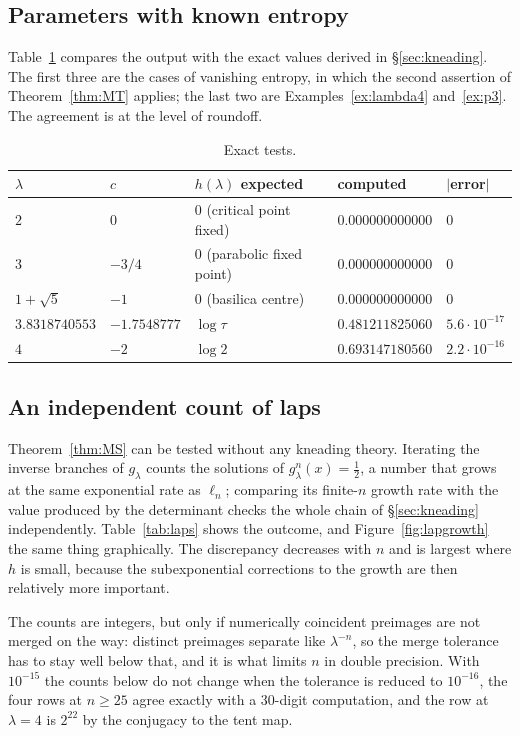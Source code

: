\documentclass[11pt]{article}
\theoremstyle{plain}
\theoremstyle{definition}
\begin{document}
\subsection{Parameters with known entropy}

Table~\ref{tab:exact} compares the output with the exact values derived in
\S\ref{sec:kneading}.  The first three are the cases of vanishing entropy, in which
the second assertion of Theorem~\ref{thm:MT} applies; the last two are
Examples~\ref{ex:lambda4}
and~\ref{ex:p3}.  The agreement is at the level of roundoff.

\begin{table}[h]
\centering\small
\setlength{\tabcolsep}{7pt}
\begin{tabular}{lllll}
\toprule
$\lambda$ & $c$ & $h(\lambda)$ expected & computed & $|$error$|$ \\
\midrule
$2$ & $0$ & $0$ (critical point fixed) & $0.000000000000$ & $0$ \\
$3$ & $-3/4$ & $0$ (parabolic fixed point) & $0.000000000000$ & $0$ \\
$1+\sqrt5$ & $-1$ & $0$ (basilica centre) & $0.000000000000$ & $0$ \\
$3.8318740553$ & $-1.7548777$ & $\log\tau$ & $0.481211825060$ & $5.6\cdot10^{-17}$ \\
$4$ & $-2$ & $\log2$ & $0.693147180560$ & $2.2\cdot10^{-16}$ \\
\bottomrule
\end{tabular}
\caption{Exact tests.}
\label{tab:exact}
\end{table}

\subsection{An independent count of laps}

Theorem~\ref{thm:MS} can be tested without any kneading theory.  Iterating the inverse
branches of $g_\lambda$ counts the solutions of $g_\lambda^n(x)=\tfrac12$, a number that
grows at the same exponential rate as $\ell_n$; comparing its finite-$n$ growth rate with
the value produced by the determinant checks the whole chain of \S\ref{sec:kneading}
independently.  Table~\ref{tab:laps} shows the outcome, and Figure~\ref{fig:lapgrowth}
the same thing graphically.  The discrepancy decreases with $n$
and is largest where $h$ is small, because the subexponential corrections to the growth are
then relatively more important.

The counts are integers, but only if numerically coincident preimages are not merged on the
way: distinct preimages separate like $\lambda^{-n}$, so the merge tolerance has to stay well
below that, and it is what limits $n$ in double precision.  With $10^{-15}$ the counts below do
not change when the tolerance is reduced to $10^{-16}$, the four rows at $n\ge25$ agree exactly
with a $30$-digit computation, and the row at $\lambda=4$ is $2^{22}$ by the conjugacy to the
tent map.
\end{document}
